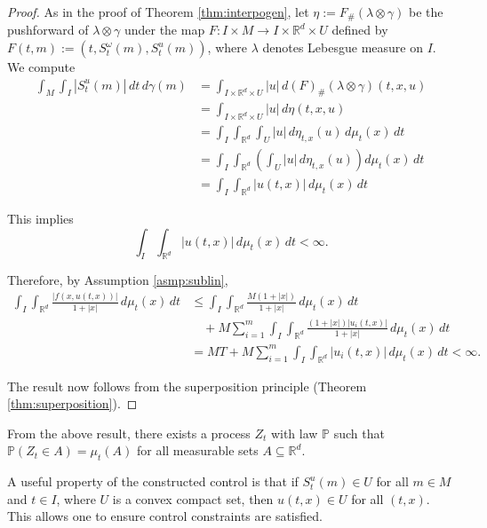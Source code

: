 \documentclass{article}
\begin{document}
\begin{proof}
As in the proof of Theorem \ref{thm:interpogen}, let $\eta := F_{\#}(\lambda \otimes \gamma)$ be the pushforward of $\lambda \otimes \gamma$ under the map $F: I \times M \rightarrow I \times \mathbb{R}^d \times U$ defined by $F(t,m) := (t,S^\omega_t(m),S^u_t(m))$, where $\lambda$ denotes Lebesgue measure on $I$. We compute
\begin{align*}
\int_M \int_I |S^u_t(m)| \, dt \, d\gamma(m) 
&= \int_{I \times \mathbb{R}^d \times U} |u| \, d(F)_{\#}(\lambda \otimes \gamma)(t,x,u) \\
&= \int_{I \times \mathbb{R}^d \times U} |u| \, d\eta(t,x,u)\\
&= \int_I \int_{\mathbb{R}^d} \int_{U} |u| \, d\eta_{t,x}(u) \, d\mu_t(x) \, dt \\
&= \int_I \int_{\mathbb{R}^d} \left(\int_{U} |u| \, d\eta_{t,x}(u)\right) d\mu_t(x) \, dt \\
&= \int_I \int_{\mathbb{R}^d} |u(t,x)| \, d\mu_t(x) \, dt 
\end{align*}

This implies
\[\int_I \int_{\mathbb{R}^d} |u(t,x)| \, d\mu_t(x) \, dt < \infty.\]

Therefore, by Assumption \ref{asmp:sublin},
\begin{align*}
\int_I \int_{\mathbb{R}^d} \frac{|f(x,u(t,x))|}{1+|x|} \, d\mu_t(x) \, dt 
&\leq \int_I \int_{\mathbb{R}^d} \frac{M(1 + |x|)}{1+|x|} \, d\mu_t(x) \, dt \\
&\quad + M\sum_{i=1}^m \int_I \int_{\mathbb{R}^d} \frac{(1 + |x|)|u_i(t,x)|}{1+|x|} \, d\mu_t(x) \, dt \\
&= MT + M\sum_{i=1}^m \int_I \int_{\mathbb{R}^d} |u_i(t,x)| \, d\mu_t(x) \, dt < \infty.
\end{align*}

The result now follows from the superposition principle (Theorem \ref{thm:superposition}).
\end{proof}

From the above result, there exists a process $Z_t$ with law $\mathbb{P}$ such that $\mathbb{P}(Z_t \in A) = \mu_t(A)$ for all measurable sets $A \subseteq \mathbb{R}^d$.

A useful property of the constructed control is that if $S^u_t(m) \in U$ for all $m \in M$ and $t \in I$, where $U$ is a convex compact set, then $u(t,x) \in U$ for all $(t,x)$. This allows one to ensure control constraints are satisfied.

\end{document}
